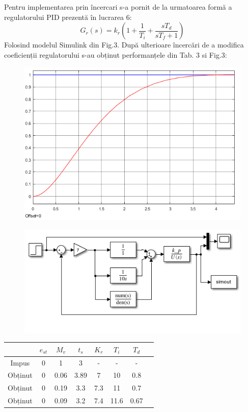 \documentclass[11pt]{article}
\newcommand{\EqRow}{\vspace{1.5mm}}
\begin{document}
Pentru implementarea prin încercari s-a pornit de la urmatoarea formă a regulatorului PID prezentă în lucrarea 6:
\begin{equation} 
G_r(s)=k_r(1+\frac{1}{T_i}+\frac{sT_d}{sT_f+1})
\end{equation}
Folosind modelul Simulink din Fig.3.
După ulterioare încercări de a modifica coeficienții regulatorului s-au obținut performanțele din Tab. 3 si Fig.3:
\EqRow
\begin{figure}[H]
	\centering
	\begin{minipage}{.4\textwidth}
		\centering
		\includegraphics[width=1\linewidth]{incercari.png}
		\label{fig:test2}
	\end{minipage}
	\begin{minipage}{.5\textwidth}
		\centering
		\includegraphics[width=1\linewidth]{sim_incercari.png}
		\label{fig:test2}
	\end{minipage}
\end{figure}
\begin{center}
	\begin{tabular}{|c|c|c|c|c|c|c|c|}
		\hline
		&$e_{st}$&$M_v$&$t_s$&$K_r$&$T_i$&$T_d$\\
		\hline
		Impus&0&1&3&-&-&-\\
		\hline
		Obținut&0&0.06&3.89&7&10&0.8\\
		Obținut&0&0.19&3.3&7.3&11&0.7\\
		Obținut&0&0.09&3.2&7.4&11.6&0.67\\
		\hline
	\end{tabular}
\end{center}
\newpage
\end{document}
